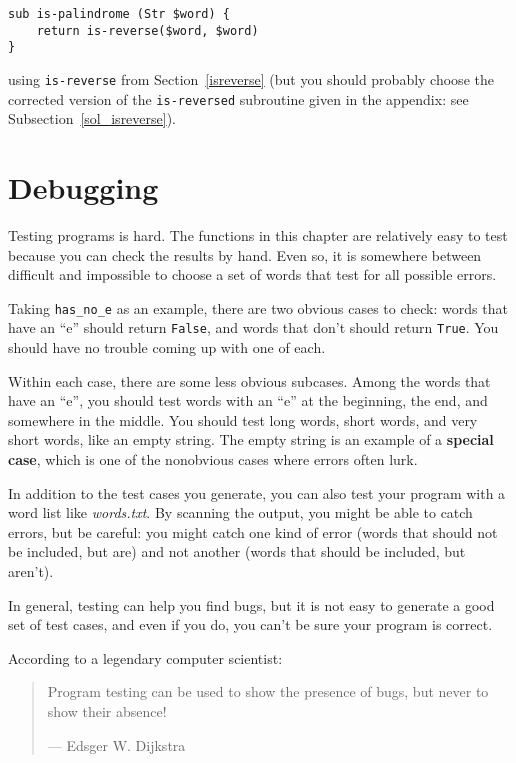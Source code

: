 \begin{verbatim}
sub is-palindrome (Str $word) {
    return is-reverse($word, $word)
}
\end{verbatim}
%
using \verb"is-reverse" from Section~\ref{isreverse} (but
you should probably choose the corrected version of the 
{\tt is-reversed} subroutine given in the appendix: 
see Subsection~\ref{sol_isreverse}).


\section{Debugging}

Testing programs is hard.  The functions in this chapter are
relatively easy to test because you can check the results by hand.
Even so, it is somewhere between difficult and impossible to choose a
set of words that test for all possible errors.

Taking \verb"has_no_e" as an example, there are two obvious
cases to check: words that have an ``e'' should return {\tt False}, and
words that don't should return {\tt True}.  You should have no
trouble coming up with one of each.

Within each case, there are some less obvious subcases.  Among the
words that have an ``e'', you should test words with an ``e'' at the
beginning, the end, and somewhere in the middle.  You should test long
words, short words, and very short words, like an empty string.  The
empty string is an example of a {\bf special case}, which is one of
the nonobvious cases where errors often lurk.

In addition to the test cases you generate, you can also test
your program with a word list like \emph{words.txt}.  By scanning
the output, you might be able to catch errors, but be careful:
you might catch one kind of error (words that should not be
included, but are) and not another (words that should be included,
but aren't).

In general, testing can help you find bugs, but it is not easy to
generate a good set of test cases, and even if you do, you can't
be sure your program is correct.

According to a legendary computer scientist:

\begin{quote}
Program testing can be used to show the presence of bugs, 
but never to show their absence!

--- Edsger W. Dijkstra
\end{quote}


